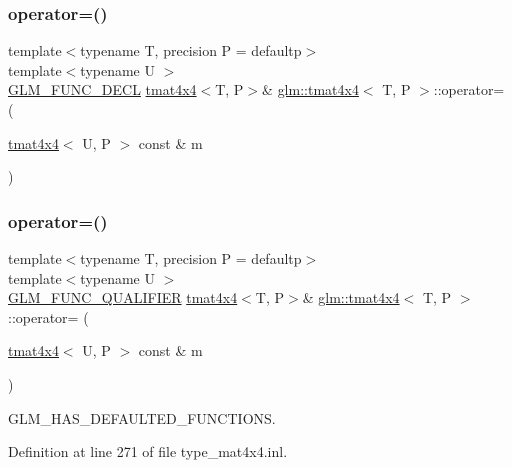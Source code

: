 \subsubsection{\texorpdfstring{operator=()}{operator=()}\hspace{0.1cm}{\footnotesize\ttfamily [2/3]}}
{\footnotesize\ttfamily template$<$typename T, precision P = defaultp$>$ \\
template$<$typename U $>$ \\
\mbox{\hyperlink{setup_8hpp_ab2d052de21a70539923e9bcbf6e83a51}{G\+L\+M\+\_\+\+F\+U\+N\+C\+\_\+\+D\+E\+CL}} \mbox{\hyperlink{structglm_1_1tmat4x4}{tmat4x4}}$<$T, P$>$\& \mbox{\hyperlink{structglm_1_1tmat4x4}{glm\+::tmat4x4}}$<$ T, P $>$\+::operator= (\begin{DoxyParamCaption}\item[{\mbox{\hyperlink{structglm_1_1tmat4x4}{tmat4x4}}$<$ U, P $>$ const \&}]{m }\end{DoxyParamCaption})}

\mbox{\label{structglm_1_1tmat4x4_a967c1c1711875b670d5a325d86566209}} 
\subsubsection{\texorpdfstring{operator=()}{operator=()}\hspace{0.1cm}{\footnotesize\ttfamily [3/3]}}
{\footnotesize\ttfamily template$<$typename T, precision P = defaultp$>$ \\
template$<$typename U $>$ \\
\mbox{\hyperlink{setup_8hpp_a33fdea6f91c5f834105f7415e2a64407}{G\+L\+M\+\_\+\+F\+U\+N\+C\+\_\+\+Q\+U\+A\+L\+I\+F\+I\+ER}} \mbox{\hyperlink{structglm_1_1tmat4x4}{tmat4x4}}$<$T, P$>$\& \mbox{\hyperlink{structglm_1_1tmat4x4}{glm\+::tmat4x4}}$<$ T, P $>$\+::operator= (\begin{DoxyParamCaption}\item[{\mbox{\hyperlink{structglm_1_1tmat4x4}{tmat4x4}}$<$ U, P $>$ const \&}]{m }\end{DoxyParamCaption})}



G\+L\+M\+\_\+\+H\+A\+S\+\_\+\+D\+E\+F\+A\+U\+L\+T\+E\+D\+\_\+\+F\+U\+N\+C\+T\+I\+O\+NS. 



Definition at line 271 of file type\+\_\+mat4x4.\+inl.

